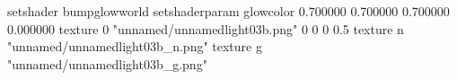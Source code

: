 setshader bumpglowworld
setshaderparam glowcolor 0.700000 0.700000 0.700000 0.000000
texture 0 "unnamed/unnamedlight03b.png" 0 0 0 0.5
texture n "unnamed/unnamedlight03b_n.png"
texture g "unnamed/unnamedlight03b_g.png"